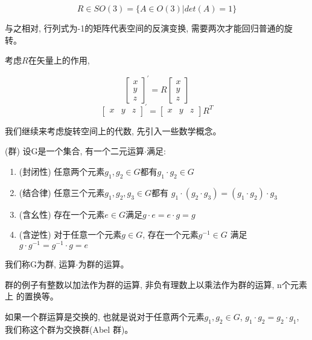 \documentclass{ctexart}
\numberwithin{equation}{subsection}
\numberwithin{theorem}{subsection}
\numberwithin{definition}{subsection}
\numberwithin{proof}{subsection}
\numberwithin{lemma}{subsection}
\numberwithin{example}{subsection}
\numberwithin{remark}{subsection}
\numberwithin{corollary}{subsection}
\numberwithin{exercise}{subsection}
\numberwithin{problem}{subsection}
\numberwithin{question}{section}
\numberwithin{method}{subsection}
\begin{document}
    \begin{equation}
        R \in SO(3) = \{A \in O(3) | det(A) = 1\}
    \end{equation}

    与之相对, 行列式为-1的矩阵代表空间的反演变换, 需要两次才能回归普通的旋转。

    考虑$R$在矢量上的作用, 

    \begin{equation}
        \begin{bmatrix}
            x \\ y \\ z
        \end{bmatrix}^\prime = R \begin{bmatrix}
            x \\ y \\ z
        \end{bmatrix}
    \end{equation}
    \begin{equation}
        \begin{bmatrix}
            x & y & z
        \end{bmatrix}^\prime = \begin{bmatrix}
            x & y & z
        \end{bmatrix} R^T
    \end{equation}

    我们继续来考虑旋转空间上的代数, 先引入一些数学概念。

    (群) 设G是一个集合, 有一个二元运算\(\cdot\)满足:
    \begin{enumerate}
        \item (封闭性) 任意两个元素\(g_1, g_2 \in G\)都有\(g_1 \cdot g_2 \in G\)
        \item (结合律) 任意三个元素\(g_1, g_2, g_3 \in G\)都有
            \(g_1 \cdot (g_2 \cdot g_3) = (g_1 \cdot g_2) \cdot g_3\)
        \item (含幺性) 存在一个元素\(e \in G\)满足\(g \cdot e = e \cdot g = g\)
        \item (含逆性) 对于任意一个元素\(g \in G\), 存在一个元素\(g^{-1} \in G\)
            满足\(g \cdot g^{-1} = g^{-1} \cdot g = e\)
    \end{enumerate}
    我们称G为群, 运算\(\cdot\)为群的运算。

    群的例子有整数以加法作为群的运算, 非负有理数上以乘法作为群的运算, n个元素上
    的置换等。

    如果一个群运算是交换的, 也就是说对于任意两个元素\(g_1, g_2 \in G\),
    \(g_1 \cdot g_2 = g_2 \cdot g_1\), 我们称这个群为交换群(Abel 群)。
\end{document}
